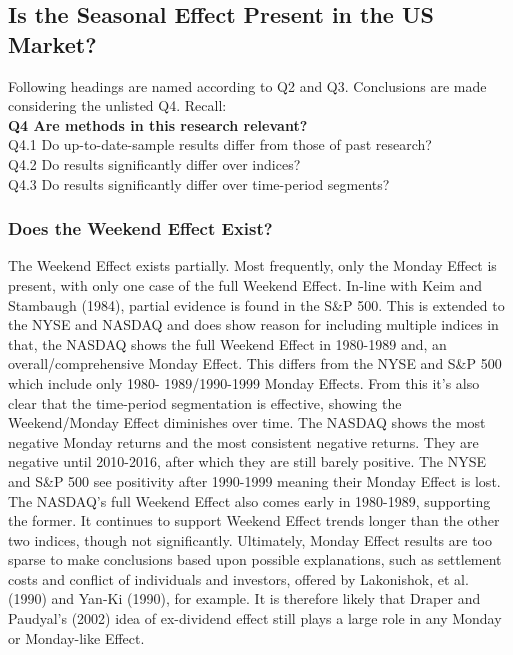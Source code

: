 \documentclass[11pt, english]{article}
\begin{document}
	\newpage

	\subsection{Is the Seasonal Effect Present in the US Market?}

	Following headings are named according to Q2 and Q3. Conclusions are made considering the unlisted Q4. Recall:\\

	\textbf{Q4 Are methods in this research relevant?}\\ Q4.1 Do up-to-date-sample results differ from those of past research?\\ Q4.2 Do results significantly differ over indices?\\ Q4.3 Do results significantly differ over time-period segments?

		\subsubsection{Does the Weekend Effect Exist?}

		The Weekend Effect exists partially. Most frequently, only the Monday Effect is present, with only one case of the full Weekend Effect. In-line with Keim and Stambaugh (1984), partial evidence is found in the S\&P 500. This is extended to the NYSE and NASDAQ and does show reason for including multiple indices in that, the NASDAQ shows the full Weekend Effect in 1980-1989 and, an overall/comprehensive Monday Effect. This differs from the NYSE and S\&P 500 which include only 1980- 1989/1990-1999 Monday Effects. From this it’s also clear that the time-period segmentation is effective, showing the Weekend/Monday Effect diminishes over time. The NASDAQ shows the most negative Monday returns and the most consistent negative returns. They are negative until 2010-2016, after which they are still barely positive. The NYSE and S\&P 500 see positivity after 1990-1999 meaning their Monday Effect is lost. The NASDAQ’s full Weekend Effect also comes early in 1980-1989, supporting the former. It continues to support Weekend Effect trends longer than the other two indices, though not significantly. Ultimately, Monday Effect results are too sparse to make conclusions based upon possible explanations, such as settlement costs and conflict of individuals and investors, offered by Lakonishok, et al. (1990) and Yan-Ki (1990), for example. It is therefore likely that Draper and Paudyal's (2002) idea of ex-dividend effect still plays a large role in any Monday or Monday-like Effect.
\end{document}
